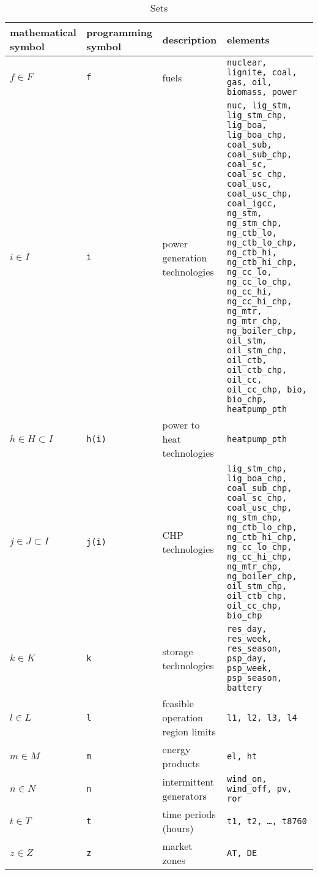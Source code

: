 \documentclass[review, 3p, times]{elsarticle} %
\begin{document}
\begin{table}
\caption{Sets}
\begin{tabulary}{\textwidth}{LLLp{6cm}}
\toprule
mathematical symbol & programming symbol & description & elements                                                      \\
\midrule
$f \in F$             & \texttt{f}         & fuels & \texttt{nuclear, lignite, coal, gas, oil, biomass, power}     \\
$i \in I$             & \texttt{i}         & power generation technologies & \texttt{nuc, lig\_stm, lig\_stm\_chp, lig\_boa, lig\_boa\_chp,
coal\_sub, coal\_sub\_chp, coal\_sc, coal\_sc\_chp, coal\_usc,
coal\_usc\_chp, coal\_igcc, ng\_stm, ng\_stm\_chp, ng\_ctb\_lo,
ng\_ctb\_lo\_chp, ng\_ctb\_hi, ng\_ctb\_hi\_chp, ng\_cc\_lo,
ng\_cc\_lo\_chp, ng\_cc\_hi, ng\_cc\_hi\_chp, ng\_mtr,
ng\_mtr\_chp, ng\_boiler\_chp, oil\_stm, oil\_stm\_chp,
oil\_ctb, oil\_ctb\_chp, oil\_cc, oil\_cc\_chp, bio,
bio\_chp, heatpump\_pth}                                        \\
$h \in H \subset I$     & \texttt{h(i)}    & power to heat technologies & \texttt{heatpump\_pth}                                        \\
$j \in J \subset I$     & \texttt{j(i)}    & CHP technologies & \texttt{lig\_stm\_chp, lig\_boa\_chp, coal\_sub\_chp,
            coal\_sc\_chp, coal\_usc\_chp, ng\_stm\_chp, ng\_ctb\_lo\_chp,
            ng\_ctb\_hi\_chp, ng\_cc\_lo\_chp, ng\_cc\_hi\_chp,
            ng\_mtr\_chp, ng\_boiler\_chp,
            oil\_stm\_chp, oil\_ctb\_chp, oil\_cc\_chp, bio\_chp}           \\
            $k \in K$               & \texttt{k}       & storage technologies & \texttt{res\_day, res\_week, res\_season, psp\_day,
            psp\_week, psp\_season, battery}                                \\
            $l \in L$               & \texttt{l}       & feasible operation region limits & \texttt{l1, l2, l3, l4}                                       \\
            $m \in M$               & \texttt{m}       & energy products & \texttt{el, ht}                                               \\
            $n \in N$               & \texttt{n}       & intermittent generators & \texttt{wind\_on, wind\_off, pv, ror}                         \\
            $t \in T$               & \texttt{t}       & time periods (hours)               & \texttt{t1, t2, \ldots, t8760}                                \\
            $z \in Z$               & \texttt{z}       & market zones & \texttt{AT, DE}                                               \\
            \bottomrule
        \end{tabulary}
    \end{table}
\end{document}
